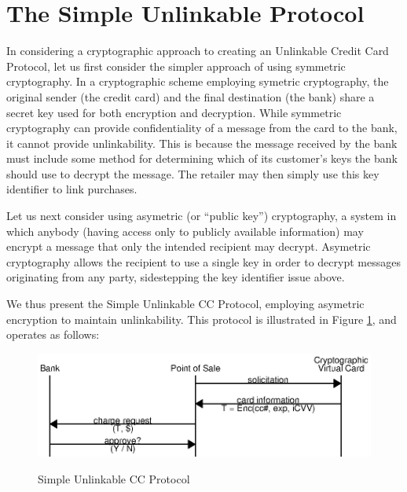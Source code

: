 \section{The Simple Unlinkable Protocol}
\label{sec:unlinkable-simple}

In considering a cryptographic approach to creating an Unlinkable Credit Card Protocol, let us first consider the simpler approach of using symmetric cryptography.
In a cryptographic scheme employing symetric cryptography,
    the original sender (the credit card) and the final destination (the bank) share a secret key used for both encryption and decryption.
While symmetric cryptography can provide confidentiality of a message from the card to the bank, it cannot provide unlinkability.
This is because the message received by the bank must include some method for determining which of its customer's keys the bank should use to decrypt the message.
The retailer may then simply use this key identifier to link purchases.

Let us next consider using asymetric (or ``public key'') cryptography,
  a system in which anybody (having access only to publicly available information) may encrypt a message that only the intended recipient may decrypt.
Asymetric cryptography allows the recipient to use a single key in order to decrypt messages originating from any party, sidestepping the key identifier issue above.

We thus present the Simple Unlinkable CC Protocol, employing asymetric encryption to maintain unlinkability.
This protocol is illustrated in Figure \ref{fig:simple-cpp}, and operates as follows:

\begin{figure}[h]
  \caption{Simple Unlinkable CC Protocol}
  \centering
    \includegraphics{img/simple-unlinkable-cpp.eps}
  \label{fig:simple-cpp}
\end{figure}

